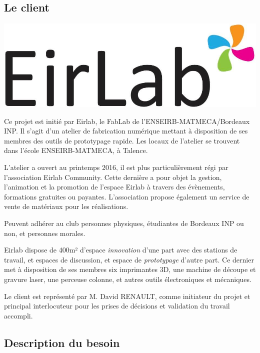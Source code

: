 \subsection{Le client}

\begin{center}
\includegraphics[scale=0.11]{img/eirlab_logo.png}
\end{center}

Ce projet est initié par Eirlab, le FabLab de l'ENSEIRB-MATMECA/Bordeaux INP. Il s'agit d'un atelier de fabrication numérique mettant à disposition de ses membres des outils de prototypage rapide. Les locaux de l'atelier se trouvent dans l'école ENSEIRB-MATMECA, à Talence.

L'atelier a ouvert au printemps 2016, il est plus particulièrement régi par l'association Eirlab Community. Cette dernière a pour objet la gestion, l'animation et la promotion de l'espace Eirlab à travers des évènements, formations gratuites ou payantes. L'association propose également un service de vente de matériaux pour les réalisations.

Peuvent adhérer au club personnes physiques, étudiantes de Bordeaux INP ou non, et personnes morales. 

Eirlab dispose de 400m² d'espace \textit{innovation} d'une part avec des stations de travail, et espaces de discussion, et espace de \textit{prototypage} d'autre part. Ce dernier met à disposition de ses membres six imprimantes 3D, une machine de découpe et gravure laser, une perceuse colonne, et autres outils électroniques et mécaniques. 

Le client est représenté par M. David RENAULT, comme initiateur du projet et principal interlocuteur pour les prises de décisions et validation du travail accompli. 


\subsection{Description du besoin}

